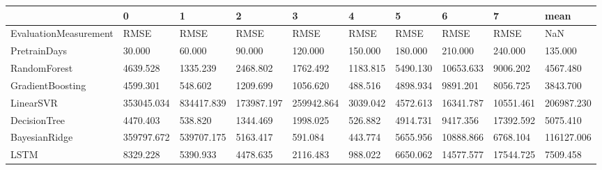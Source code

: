 \begin{tabular}{llllllllll}
\toprule
{} &          0 &          1 &          2 &          3 &        4 &        5 &         6 &         7 &       mean \\
\midrule
EvaluationMeasurement &       RMSE &       RMSE &       RMSE &       RMSE &     RMSE &     RMSE &      RMSE &      RMSE &        NaN \\
PretrainDays          &     30.000 &     60.000 &     90.000 &    120.000 &  150.000 &  180.000 &   210.000 &   240.000 &    135.000 \\
RandomForest          &   4639.528 &   1335.239 &   2468.802 &   1762.492 & 1183.815 & 5490.130 & 10653.633 &  9006.202 &   4567.480 \\
GradientBoosting      &   4599.301 &    548.602 &   1209.699 &   1056.620 &  488.516 & 4898.934 &  9891.201 &  8056.725 &   3843.700 \\
LinearSVR             & 353045.034 & 834417.839 & 173987.197 & 259942.864 & 3039.042 & 4572.613 & 16341.787 & 10551.461 & 206987.230 \\
DecisionTree          &   4470.403 &    538.820 &   1344.469 &   1998.025 &  526.882 & 4914.731 &  9417.356 & 17392.592 &   5075.410 \\
BayesianRidge         & 359797.672 & 539707.175 &   5163.417 &    591.084 &  443.774 & 5655.956 & 10888.866 &  6768.104 & 116127.006 \\
LSTM                  &   8329.228 &   5390.933 &   4478.635 &   2116.483 &  988.022 & 6650.062 & 14577.577 & 17544.725 &   7509.458 \\
\bottomrule
\end{tabular}

